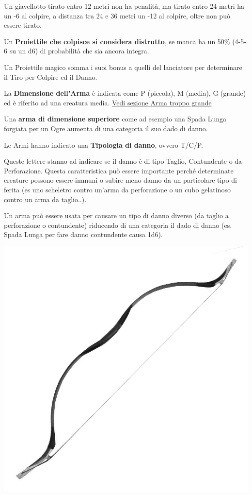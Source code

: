 \begin{multicols}{2}
Un giavellotto tirato entro 12 metri non ha penalità, ma tirato entro 24 metri ha un -6 al colpire, a distanza tra 24 e 36 metri un -12 al colpire, oltre non può essere tirato.

Un \textbf{Proiettile che colpisce si considera distrutto}, se manca ha un 50\% (4-5-6 su un d6) di probabilità che sia ancora integra.

Un Proiettile magico somma i suoi bonus a quelli del lanciatore per determinare il Tiro per Colpire ed il Danno.

La \textbf{Dimensione dell'Arma}\label{dimensionediunarma}\hypertarget{dimensionediunarma}{} è indicata come P (piccola), M (media), G (grande) ed è riferito ad una creatura media. \hyperref[armatroppogrande]{Vedi sezione Arma troppo grande}

Una \textbf{arma di dimensione superiore}  come ad esempio una Spada Lunga forgiata per un Ogre aumenta di una categoria il suo dado di danno.

Le Armi hanno indicato una \textbf{Tipologia di danno}, ovvero T/C/P.

Queste lettere stanno ad indicare se il danno è di tipo Taglio, Contundente o da Perforazione. Questa caratteristica può essere importante perché determinate creature possono essere immuni o subire meno danno da un particolare tipo di ferita (es uno scheletro contro un'arma da perforazione o un cubo gelatinoso contro un arma da taglio..).

Un arma può essere usata per causare un tipo di danno diverso (da taglio a perforazione o contundente) riducendo di una categoria il dado di danno (es. Spada Lunga per fare danno contundente causa 1d6).

\medskip

\begin{center}
	\includegraphics[width=0.7\linewidth]{immagini/bow2.png}
\end{center}


\end{multicols}

